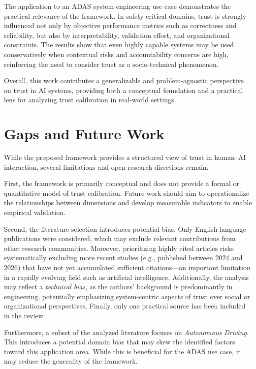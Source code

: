 \documentclass[sigconf]{acmart}
\begin{document}
The application to an ADAS system engineering use case demonstrates the practical relevance of the framework. In safety-critical domains, trust is strongly influenced not only by objective performance metrics such as correctness and reliability, but also by interpretability, validation effort, and organizational constraints. The results show that even highly capable systems may be used conservatively when contextual risks and accountability concerns are high, reinforcing the need to consider trust as a socio-technical phenomenon.

Overall, this work contributes a generalizable and problem-agnostic perspective on trust in AI systems, providing both a conceptual foundation and a practical lens for analyzing trust calibration in real-world settings.

\section{Gaps and Future Work}

While the proposed framework provides a structured view of trust in human--AI interaction, several limitations and open research directions remain.

First, the framework is primarily conceptual and does not provide a formal or quantitative model of trust calibration. Future work should aim to operationalize the relationships between dimensions and develop measurable indicators to enable empirical validation.

Second, the literature selection introduces potential bias. Only English-language publications were considered, which may exclude relevant contributions from other research communities. Moreover, prioritizing highly cited articles risks systematically excluding more recent studies (e.g., published between 2024 and 2026) that have not yet accumulated sufficient citations—an important limitation in a rapidly evolving field such as artificial intelligence. Additionally, the analysis may reflect a \emph{technical bias}, as the authors’ background is predominantly in engineering, potentially emphasizing system-centric aspects of trust over social or organizational perspectives. Finally, only one practical source has been included in the review.

Furthermore, a subset of the analyzed literature focuses on \emph{Autonomous Driving}. This introduces a potential domain bias that may skew the identified factors toward this application area. While this is beneficial for the ADAS use case, it may reduce the generality of the framework.
\end{document}
